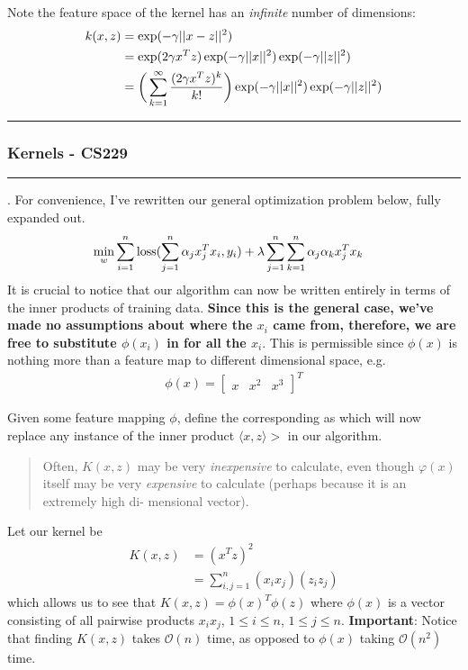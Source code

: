 \documentclass[12pt]{article}
\newcommand{\myspace}{\vspace{2\bigskipamount}}
\newcommand\p{\Needspace{10\baselineskip} \noindent}
\begin{document}
\p Note the feature space of the kernel has an \textit{infinite} number of dimensions:
\begin{align}
	k(x, z) &= \exp(-\gamma || x - z ||^2 ) \\
	&= \exp(2\gamma x^T z)\exp(-\gamma||x||^2)\exp(-\gamma||z||^2) \\
	&= \bigg( \sum_{k = 1}^{\infty} \frac{( 2\gamma x^T z)^k}{k!}\bigg)	\exp(-\gamma||x||^2)\exp(-\gamma||z||^2)
\end{align}

\hrule 
\subsubsection{Kernels - CS229}
\hrule 

\p {}. For convenience, I've rewritten our general optimization problem below, fully expanded out.
\begin{align}
&\min_{w} \sum_{i=1}^{n}  \text{loss}(\sum_{j=1}^{n}\alpha_j x_j^T x_i, y_i) + \lambda \sum_{j=1}^{n}\sum_{k=1}^{n} \alpha_j \alpha_k x_j^T x_k
\end{align}
It is crucial to notice that our algorithm can now be written entirely in terms of the inner products of training data. \textbf{Since this is the general case, we've made no assumptions about where the $x_i$ came from, therefore, we are free to substitute $\phi(x_i)$ in for all the $x_i$}. This is permissible since $\phi(x)$ is nothing more than a feature map to different dimensional space, e.g.
\begin{align}
\phi(x) = \begin{bmatrix} x & x^2 & x^3 \end{bmatrix}^T
\end{align}

\p Given some feature mapping $\phi$, define the corresponding \textbf{} as
which will now replace any instance of the inner product $\langle x, z \rangle>$ in our algorithm.
\begin{quote}
	Often, $K(x, z)$ may be very \emph{inexpensive} to calculate, even though $φ(x)$ itself may
	be very \emph{expensive} to calculate (perhaps because it is an extremely high di-
	mensional vector).
\end{quote}

\myspace
\p {} Let our kernel be 
\begin{align}
	K( x, z) &= (x^T z)^2 \\
	&= \sum_{i, j = 1}^{n} (x_i x_j) (z_i z_j)
\end{align}
which allows us to see that $K(x, z) = \phi(x)^T \phi(z)$ where $\phi(x)$ is a vector consisting of all pairwise products $x_i x_j$, $1 \le i \le n$, $1 \le j \le n$. \textbf{Important}: Notice that finding $K(x, z)$ takes $\mathcal{O}(n)$ time, as opposed to $\phi(x)$ taking $\mathcal{O}(n^2)$ time.
\end{document}
